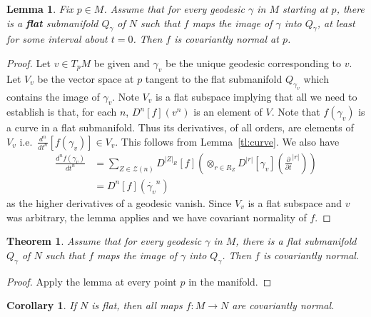 \documentclass[11pt]{article}
\newtheorem{theorem}{Theorem}
\newtheorem{lemma}{Lemma}
\newtheorem{cor}{Corollary}
\theoremstyle{remark}
\begin{document}
\begin{lemma}
Fix $p \in M$. 
Assume that for every geodesic $\gamma$ in $M$ starting at $p$, there
is a {\bf flat}
submanifold $Q_{\gamma}$ 
of $N$ such that $f$ maps the image of $\gamma$ into $Q_{\gamma}$, at
least for some interval about $t=0$.  
Then $f$ is
covariantly normal at $p$.  
\end{lemma}

\begin{proof}
Let $v \in T_pM$ be given and $\ensuremath{\gamma_v}$ be the unique geodesic
corresponding to $v$. Let $V_v$ be the vector space at $p$ tangent to the flat
submanifold $Q_{\ensuremath{\gamma_v}}$ which contains the image of $\ensuremath{\gamma_v}$. Note $V_v$
is a flat subspace implying that 
all we need to establish is that, for each $n$, 
$\ensuremath{D^{n} [{f}] ({v^n}) }$ is an element of $V$. 
Note that $f(\ensuremath{\gamma_v})$ is a curve in a flat submanifold. Thus its
derivatives, of all orders, are elements of $V_v$
i.e.\ $\ensuremath{\frac{{d}^{{n}}
{}}{{d}{{t}^{n}}}}[f(\ensuremath{\gamma_v})] \in V_v$. This follows from Lemma~\ref{tl:curve}.
We also have 
\[
\begin{split}
\ensuremath{\frac{{d}^{{n}}
{f(\ensuremath{\gamma_v})}}{{d}{{t}^{n}}}} &= \sum_{\ensuremath{Z} \in \ensuremath{\mathcal{\ensuremath{Z}}}(n)} 
\ensuremath{D^{ |\ensuremath{Z}|_R } [{f}] ({\mathop{\otimes}_{r \in R_{\ensuremath{Z}}}
\ensuremath{D^{|r|} [{\ensuremath{\gamma_v}}] ({\ensuremath{\frac{\partial {}}{\partial {t}}}^{|r|}}) }}) }\\
  &= \ensuremath{D^{n} [{f}] ({\dot{\ensuremath{\gamma_v}}^n}) }
\end{split}
\]
as the higher derivatives of a geodesic vanish. Since $V_v$ is a flat
subspace and $v$ was arbitrary,
the lemma applies and we have covariant normality of $f$. 
\end{proof}


\begin{theorem} \label{t:gcov}
Assume that for every geodesic $\gamma$ in $M$, there is a flat
submanifold $Q_{\gamma}$ 
of $N$ such that $f$ maps the image of $\gamma$ into $Q_{\gamma}$.  
Then $f$ is
covariantly normal. 
\end{theorem}

\begin{proof}
Apply the lemma at every point $p$ in the manifold.
\end{proof}


\begin{cor}
If $N$ is flat, then all maps $f: M \to N$ are covariantly normal. 
\end{cor}
\end{document}
